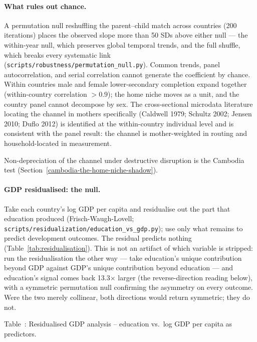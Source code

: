 \documentclass[12pt,letterpaper]{article}
\begin{document}
\paragraph{What rules out chance.}
A permutation null reshuffling the parent--child match across
countries (200 iterations) places the observed slope more
than 50 SDs above either null --- the within-year null, which
preserves global temporal trends, and the full shuffle, which
breaks every systematic link
(\nolinkurl{scripts/robustness/permutation_null.py}). Common
trends, panel autocorrelation, and serial correlation cannot
generate the coefficient by chance. Within countries male and female
lower-secondary completion expand together (within-country
correlation $>0.9$); the home niche moves as a unit, and the
country panel cannot decompose by sex. The cross-sectional
microdata literature locating the channel in mothers specifically
(Caldwell 1979; Schultz 2002; Jensen 2010; Duflo 2012) is
identified at the within-country individual level and is consistent
with the panel result: the channel is mother-weighted in routing
and household-located in measurement.

Non-depreciation of the channel under destructive disruption is
the Cambodia test (Section~\ref{cambodia-the-home-niche-shadow}).

\paragraph{GDP residualised: the null.}
Take each country's log GDP per capita and residualise out the part
that education produced (Frisch-Waugh-Lovell;
\texttt{scripts/residualization/education\_vs\_gdp.py}); use only what
remains to predict development outcomes. The residual predicts nothing
(Table~\ref{tab:residualisation}). This is not an artifact of which
variable is stripped: run the residualisation the other way --- take
education's unique contribution beyond GDP against GDP's unique
contribution beyond education --- and education's signal comes back
13.3$\times$ larger (the reverse-direction reading below), with a
symmetric permutation null confirming the asymmetry on every outcome.
Were the two merely collinear, both directions would return symmetric;
they do not.

\label{tab:residualisation}Table~\thetable: Residualised GDP analysis -- education vs.~log GDP per capita as predictors.
\end{document}
